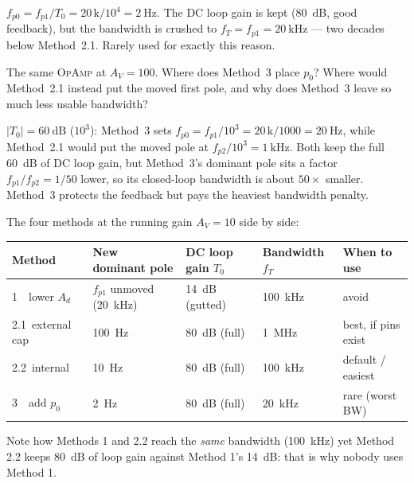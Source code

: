 \documentclass[11pt,a4paper,oneside]{book}
\newcommand{\Ad}{A_d}
\newcommand{\op}{\textsc{OpAmp}}
\begin{document}
\begin{wexample}
$f_{p0}=f_{p1}/T_0=20\,\text{k}/10^{4}=\qty{2}{\hertz}$. The DC loop gain is kept
(\qty{80}{\dB}, good feedback), but the bandwidth is crushed to
$f_T=f_{p1}=\qty{20}{\kilo\hertz}$ --- two decades below Method~2.1. Rarely used
for exactly this reason.
\end{wexample}

\begin{exercise}
The same \op{} at $A_V=100$. Where does Method~3 place $p_0$? Where would
Method~2.1 instead put the moved first pole, and why does Method~3 leave so much
less usable bandwidth?
\end{exercise}
\begin{solution}
$|T_0|=\qty{60}{\dB}$ ($10^{3}$): Method~3 sets $f_{p0}=f_{p1}/10^{3}=
20\,\text{k}/1000=\qty{20}{\hertz}$, while Method~2.1 would put the moved pole at
$f_{p2}/10^{3}=\qty{1}{\kilo\hertz}$. Both keep the full \qty{60}{\dB} of DC loop
gain, but Method~3's dominant pole sits a factor $f_{p1}/f_{p2}=1/50$ lower, so
its closed-loop bandwidth is about $50\times$ smaller. Method~3 protects the
feedback but pays the heaviest bandwidth penalty.
\end{solution}

\bigskip
The four methods at the running gain $A_V=10$ side by side:

\begin{center}\small
\begin{tabular}{@{}lllll@{}}
\toprule
\textbf{Method} & \textbf{New dominant pole} & \textbf{DC loop gain $T_0$}
  & \textbf{Bandwidth $f_T$} & \textbf{When to use}\\
\midrule
1\ \ lower $\Ad$        & $f_{p1}$ unmoved (\qty{20}{\kilo\hertz}) & \qty{14}{\dB} (gutted) & \qty{100}{\kilo\hertz} & avoid\\
2.1\ external cap       & \qty{100}{\hertz}  & \qty{80}{\dB} (full) & \qty{1}{\mega\hertz}   & best, if pins exist\\
2.2\ internal           & \qty{10}{\hertz}   & \qty{80}{\dB} (full) & \qty{100}{\kilo\hertz} & default / easiest\\
3\ \ add $p_0$          & \qty{2}{\hertz}    & \qty{80}{\dB} (full) & \qty{20}{\kilo\hertz}  & rare (worst BW)\\
\bottomrule
\end{tabular}
\end{center}

\noindent Note how Methods 1 and 2.2 reach the \emph{same} bandwidth
(\qty{100}{\kilo\hertz}) yet Method 2.2 keeps \qty{80}{\dB} of loop gain against
Method 1's \qty{14}{\dB}: that is why nobody uses Method 1.
\end{document}
